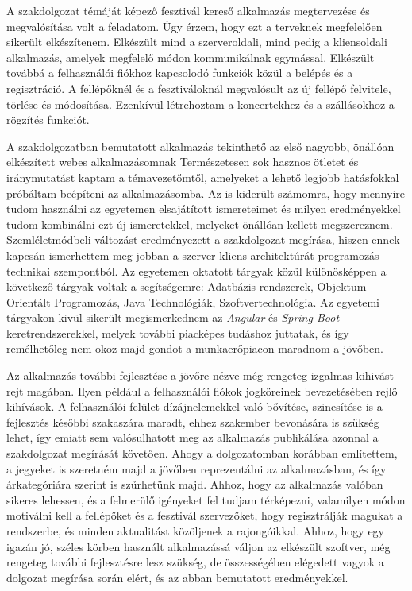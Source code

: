 
A szakdolgozat témáját képező fesztivál kereső alkalmazás megtervezése és megvalósítása volt a feladatom. Úgy érzem, hogy ezt a terveknek megfelelően sikerült elkészítenem. Elkészült mind a szerveroldali, mind pedig a kliensoldali alkalmazás, amelyek megfelelő módon kommunikálnak egymással. Elkészült továbbá a felhasználói fiókhoz kapcsolodó funkciók közül a belépés és a regisztráció. A fellépőknél és a fesztiváloknál megvalósult az új fellépő felvitele, törlése és módosítása. Ezenkívül létrehoztam a koncertekhez és a szállásokhoz a rögzítés funkciót.

A szakdolgozatban bemutatott alkalmazás tekinthető az első nagyobb, önállóan elkészített webes alkalmazásomnak Természetesen sok hasznos ötletet és iránymutatást kaptam a témavezetőmtől, amelyeket a lehető legjobb hatásfokkal próbáltam beépíteni az alkalmazásomba. Az is kiderült számomra, hogy mennyire tudom használni az egyetemen elsajátított ismereteimet és milyen eredményekkel tudom kombinálni ezt új ismeretekkel, melyeket önállóan kellett megszereznem. Szemléletmódbeli változást eredményezett a szakdolgozat megírása, hiszen ennek kapcsán ismerhettem meg jobban a szerver-kliens architektúrát programozás technikai szempontból. Az egyetemen oktatott tárgyak közül  különösképpen a következő tárgyak voltak a segítségemre:  Adatbázis rendszerek, Objektum Orientált Programozás, Java Technológiák, Szoftvertechnológia. Az egyetemi tárgyakon kivül sikerült megismerkednem az \textit{Angular} és \textit{Spring Boot} keretrendszerekkel, melyek további piacképes tudáshoz juttatak, és így remélhetőleg nem okoz majd gondot a munkaerőpiacon maradnom a jövőben.

Az alkalmazás további fejlesztése a jövőre nézve még rengeteg izgalmas kihivást rejt magában. Ilyen például a felhasználói fiókok jogköreinek bevezetésében rejlő kihívások. A felhasználói felület dízájnelemekkel való bővítése, szinesítése is a fejlesztés későbbi szakaszára maradt, ehhez szakember bevonására is szükség lehet, így emiatt sem valósulhatott meg az alkalmazás publikálása azonnal a szakdolgozat megírását követően. Ahogy a dolgozatomban korábban említettem, a jegyeket is szeretném majd a jövőben reprezentálni az alkalmazásban, és így árkategóriára szerint is szűrhetünk majd. Ahhoz, hogy az alkalmazás valóban sikeres lehessen, és a felmerülő igényeket fel tudjam térképezni,  valamilyen módon motiválni kell a fellépőket és a fesztivál szervezőket, hogy regisztrálják magukat a rendszerbe, és minden aktualitást közöljenek a rajongóikkal. Ahhoz, hogy egy igazán jó, széles körben használt alkalmazássá váljon az elkészült szoftver, még rengeteg további fejlesztésre lesz szükség, de összességében elégedett vagyok a dolgozat megírása során elért, és az abban bemutatott eredményekkel.

